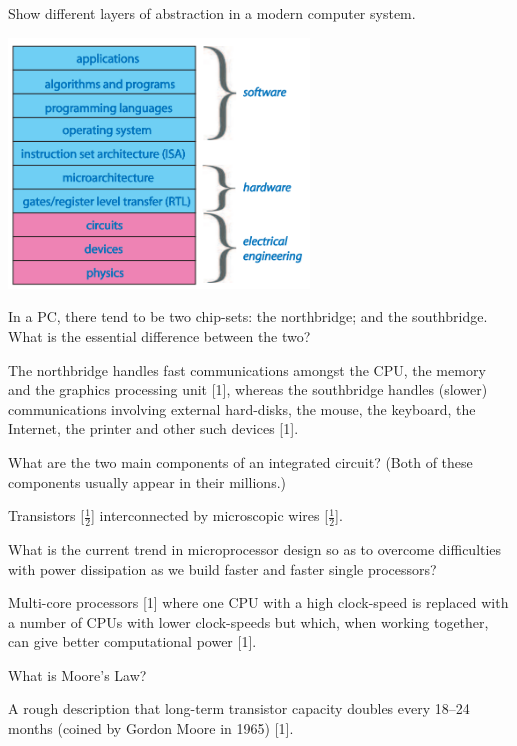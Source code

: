 \documentclass{exam}
\begin{document}
\begin{questions}
\question[4]Show different layers of abstraction in a modern computer system.
\begin{solution}[.2in]
\includegraphics[width=8cm]{CSys.png}
\end{solution}
\newpage
\question[2]In a PC, there tend to be two chip-sets: the northbridge; and the
southbridge. What is the essential difference between the two?
\begin{solution}[.2in]
The northbridge handles fast communications amongst the CPU, the
memory and the graphics processing unit [1], whereas the southbridge
handles (slower) communications involving external hard-disks, the
mouse, the keyboard, the Internet, the printer and other such devices
[1].
\end{solution}

\question[1]What are the two main components of an integrated circuit? (Both of
these components usually appear in their millions.)
\begin{solution}[.2in]
Transistors [$\frac{1}{2}$] interconnected by microscopic wires [$\frac{1}{2}$].
\end{solution}

\question[2]What is the current trend in microprocessor design so as to overcome
difficulties with power dissipation as we build faster and faster single
processors?
\begin{solution}[.2in]
Multi-core processors [1] where one CPU with a high clock-speed is
replaced with a number of CPUs with lower clock-speeds but which,
when working together, can give better computational power [1].
\end{solution}

\question[1]What is Moore’s Law?
\begin{solution}[.2in]
A rough description that long-term transistor capacity doubles every
18–24 months (coined by Gordon Moore in 1965) [1].
\end{solution}


\end{questions}
\end{document}
